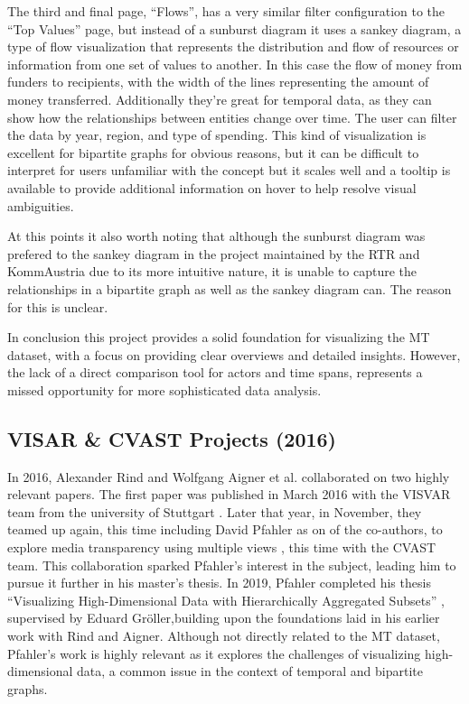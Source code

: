 \documentclass{vgtc}                          %
\begin{document}
The third and final page, ``Flows'', has a very similar filter configuration to the ``Top Values'' page, but instead of a sunburst diagram it uses a sankey diagram, a type of flow visualization that represents the distribution and flow of resources or information from one set of values to another. In this case the flow of money from funders to recipients, with the width of the lines representing the amount of money transferred. Additionally they're great for temporal data, as they can show how the relationships between entities change over time. The user can filter the data by year, region, and type of spending. This kind of visualization is excellent for bipartite graphs for obvious reasons, but it can be difficult to interpret for users unfamiliar with the concept \textendash{} but it scales well and a tooltip is available to provide additional information on hover to help resolve visual ambiguities.

At this points it also worth noting that although the sunburst diagram was prefered to the sankey diagram in the project maintained by the RTR and KommAustria due to its more intuitive nature, it is unable to capture the relationships in a bipartite graph as well as the sankey diagram can. The reason for this is unclear.

In conclusion this project provides a solid foundation for visualizing the MT dataset, with a focus on providing clear overviews and detailed insights. However, the lack of a direct comparison tool for actors and time spans, represents a missed opportunity for more sophisticated data analysis.

\subsection{VISAR \& CVAST Projects (2016)}

In 2016, Alexander Rind and Wolfgang Aigner et al. collaborated on two highly relevant papers. The first paper was published in March 2016 with the VISVAR team from the university of Stuttgart \cite{aigner2016visual}. Later that year, in November, they teamed up again, this time including David Pfahler as on of the co-authors, to explore media transparency using multiple views \cite{rind2016exploring}, this time with the CVAST team. This collaboration sparked Pfahler's interest in the subject, leading him to pursue it further in his master's thesis. In 2019, Pfahler completed his thesis ``Visualizing High-Dimensional Data with Hierarchically Aggregated Subsets'' \cite{pfahlerflexible}, supervised by Eduard Gröller,building upon the foundations laid in his earlier work with Rind and Aigner. Although not directly related to the MT dataset, Pfahler's work is highly relevant as it explores the challenges of visualizing high-dimensional data, a common issue in the context of temporal and bipartite graphs.
\end{document}
